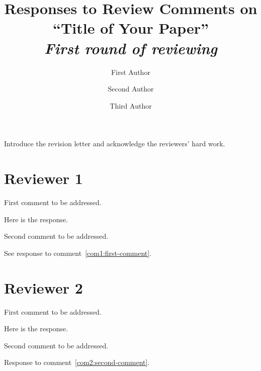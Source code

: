 \documentclass[a4paper]{article}
\begin{document}
\title{Responses to Review Comments on ``Title of Your Paper'' \\
  \vspace{0.5em} \large \emph{First round of reviewing}}
\author{First Author \and Second Author \and Third Author}

\maketitle

\setlength\parindent{0pt}

\noindent Introduce the revision letter and acknowledge the reviewers'
hard work.

\section{Reviewer 1}\label{sec:reviewer1}

\begin{revcom}
  First comment to be addressed.
\end{revcom}

\begin{response}
  Here is the response.
\end{response}

\begin{revcom}
  Second comment to be addressed.
\end{revcom}

\begin{response}
  See response to comment~\ref{com1:first-comment}.
\end{response}

\section{Reviewer 2}\label{sec:reviewer2}

\begin{revcom}
  First comment to be addressed.
\end{revcom}

\begin{response}
  Here is the response.
\end{response}

\begin{revcom}
  Second comment to be addressed.
\end{revcom}

\begin{response}
  Response to comment~\ref{com2:second-comment}.
\end{response}



\end{document}
